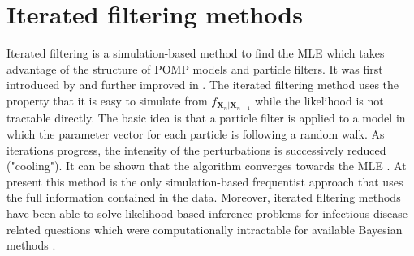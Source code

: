 \section{Iterated filtering methods}
\label{iterated_filtering}
Iterated filtering  is a simulation-based method  to find the MLE which takes advantage of the structure of POMP models and particle filters. It was first introduced  by \cite{ionides06} and further improved in \cite{Ionides2015}. The iterated filtering method uses the property that it is easy to simulate from $f_{\bm{X}_n|\bm{X}_{n-1}}$ while the likelihood is not tractable directly.
The basic idea is that a particle filter is applied to a model in which  the parameter vector for each particle is following a random walk.
As iterations progress, the intensity of the perturbations is successively reduced ("cooling").
It can be shown that the algorithm converges towards the MLE \citep{Ionides2015}. At present  this method is the only simulation-based frequentist approach that uses the full information contained in the data. Moreover, iterated filtering methods have been able to solve likelihood-based inference problems for infectious disease related questions which were computationally intractable for available Bayesian methods \citep{Ionides2015}.
